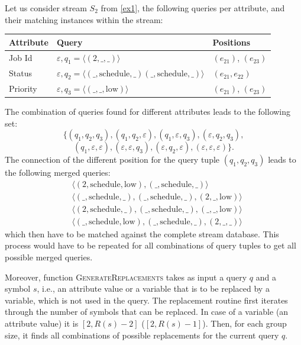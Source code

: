 \begin{example}
	\label{ex:merge}
	Let us consider stream $S_2$ from \autoref{ex1}, the following queries
	per
	attribute, and their matching instances within the stream:



	\begin{center}
		\smallskip
		{\footnotesize
			\begin{tabular}{lll}
				\toprule
				Attribute & Query &  Positions \\
				\midrule
				Job Id & $\varepsilon, q_1=\langle (2,\_,\_) \rangle$   &
				$(e_{21})$, $(e_{23})$  \\
				Status   & $\varepsilon, q_2=\langle (\_,\text{schedule},\_)
				(\_,\text{schedule},\_) \rangle$ & $(e_{21}, e_{22})$   \\
				Priority   & $\varepsilon, q_3=\langle (\_,\_,\text{low})
				\rangle$ & $(e_{21})$, $(e_{23})$   \\
				\bottomrule
		\end{tabular}}
	\end{center}
	The combination of queries found for different attributes leads to the
	following set:
	$$\{(q_1,q_2,q_3), (q_1,q_2,\varepsilon), (q_1,\varepsilon,q_3),
	(\varepsilon,q_2,q_3),$$ $$(q_1,\varepsilon,\varepsilon),
	(\varepsilon,\varepsilon,q_3),
	(\varepsilon,q_2,\varepsilon),(\varepsilon,\varepsilon,\varepsilon)\}. $$
	The connection of the different position for the query tuple
	$(q_1,q_2,q_3)$ leads to the following merged queries:
	\begin{align*}
		&\langle (2,\text{schedule},\text{low}),(\_,\text{schedule},\_)
		\rangle \\
		&\langle
		(\_,\text{schedule},\_),(\_,\text{schedule},\_),(2,\_,\text{low})
		\rangle \\
		&\langle
		(2,\text{schedule},\_),(\_,\text{schedule},\_),(\_,\_,\text{low})
		\rangle \\
		&\langle
		(\_,\text{schedule},\text{low}),(\_,\text{schedule},\_),(2,\_,\_)
		\rangle
	\end{align*}
	which then have to be matched against the complete stream database.
	This process would have to be repeated for all combinations of query
	tuples to get all possible merged queries.
\end{example}

Moreover, function \textsc{GenerateReplacements} takes as input a query $q$
and a symbol $s$, i.e., an attribute value or a variable that is to be
replaced by a variable, which is not used in the query.
The replacement routine first iterates through the number of symbols that can be replaced. In case of a variable (an attribute value) it is $[2,R(s)-2]$ ($[2,R(s)-1]$).
Then, for each group size, it finds all combinations of possible replacements for the current query $q$.

